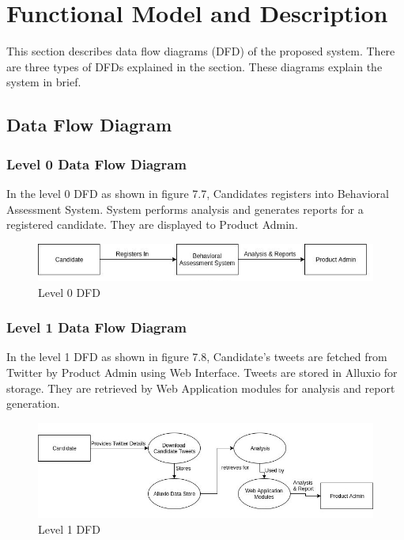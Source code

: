 \documentclass[oneside,a4paper,12pt]{pictreport}
\begin{document}
\section{Functional Model and Description}
This section describes data flow diagrams (DFD) of the proposed system. There are three types of DFDs explained in the section. These diagrams explain the system in brief.

\subsection{Data Flow Diagram}
\subsubsection{Level 0 Data Flow Diagram}
In the level 0 DFD as shown in figure 7.7, Candidates registers into Behavioral Assessment System. System performs analysis and generates reports for a registered candidate. They are displayed to Product Admin.\\
\begin{figure}[h!]
\includegraphics[width=4.5in]{DFD-0.jpg}
\caption{Level 0 DFD}
\end{figure}

\subsubsection{Level 1 Data Flow Diagram}
In the level 1 DFD as shown in figure 7.8, Candidate's tweets are fetched from Twitter by Product Admin using Web Interface. Tweets are stored in Alluxio for storage. They are retrieved by Web Application modules for analysis and report generation.\\
\begin{figure}[h!]
\includegraphics[width=4.5in]{DFD-1.jpg}
\caption{Level 1 DFD}
\end{figure}
\end{document}
